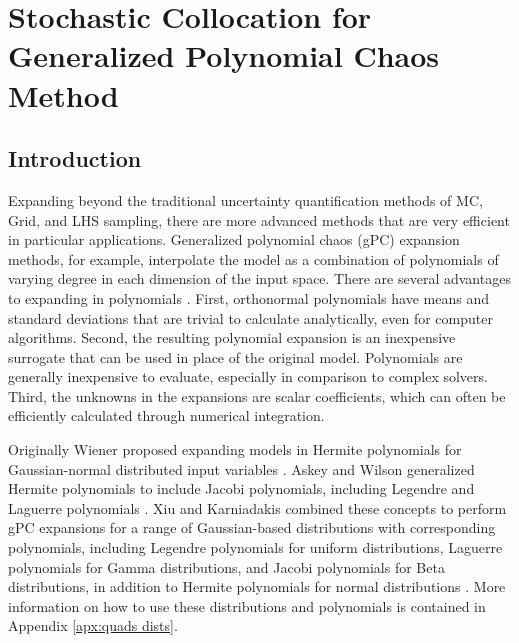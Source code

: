 
\chapter{Stochastic Collocation for Generalized Polynomial Chaos Method} %

\label{ch:methods scgpc} %



\section{Introduction}
Expanding beyond the traditional uncertainty quantification methods of MC, Grid, and LHS sampling, there are more
advanced methods that are very efficient in particular applications.
Generalized polynomial chaos (gPC) expansion methods, for example, interpolate the model as a combination of
polynomials of varying degree in each dimension of the input space.  There are several advantages to expanding
in polynomials \cite{xiu}.  First, orthonormal polynomials have means and standard deviations that are trivial to calculate
analytically, even for computer algorithms.  Second, the resulting polynomial expansion is an
inexpensive surrogate that can be used in place of the original model.  Polynomials are generally inexpensive
to evaluate, especially in comparison to complex solvers.  Third, the unknowns in the expansions
are scalar coefficients, which can often be efficiently calculated through numerical integration.

Originally Wiener
proposed expanding models in Hermite polynomials for Gaussian-normal distributed input variables \cite{wiener}.  Askey and
Wilson generalized Hermite polynomials to include Jacobi polynomials, including Legendre and Laguerre
polynomials \cite{Wiener-Askey}.  Xiu and Karniadakis combined these concepts to perform gPC expansions for a 
range of Gaussian-based distributions with corresponding polynomials,
including Legendre polynomials for uniform distributions, Laguerre polynomials for Gamma distributions, and
Jacobi polynomials for Beta distributions, in addition to Hermite polynomials for normal distributions
\cite{xiu}.  More information on how to use these distributions and polynomials is contained in Appendix
\ref{apx:quads dists}.

